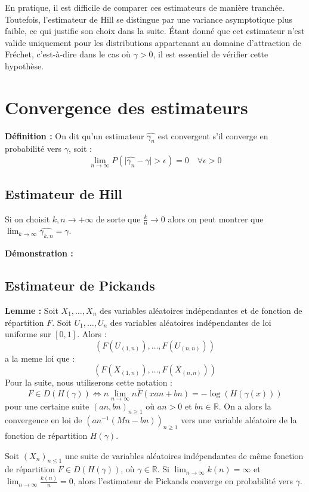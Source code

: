 \documentclass{article}
\begin{document}
En pratique, il est difficile de comparer ces estimateurs de manière tranchée. Toutefois, l'estimateur de Hill se distingue par une variance asymptotique plus faible, ce qui justifie son choix dans la suite. Étant donné que cet estimateur n'est valide uniquement pour les distributions appartenant au domaine d'attraction de Fréchet, c'est-à-dire dans le cas où \(\gamma > 0\), il est essentiel de vérifier cette hypothèse. 
\section{Convergence des estimateurs}

\textbf{Définition :}
On dit qu'un estimateur \(\hat{\gamma_{n}}\) est convergent s'il converge en probabilité vers \(\gamma\), soit :
\[
\lim_{n \to \infty} P(\lvert \hat{\gamma_{n}} - \gamma \rvert > \epsilon) = 0 \quad \forall \epsilon > 0
\]
\subsection{Estimateur de Hill}

Si on choisit \(k,n \to +\infty\) de sorte que \(\frac{k}{n} \to 0\) alors on peut montrer que \(\lim_{k \to \infty} \hat{\gamma_{k,n}} = \gamma\).

\textbf{Démonstration :}

\subsection{Estimateur de Pickands}
\textbf{Lemme :} Soit \(X_1, \dots, X_n\) des variables aléatoires indépendantes et de fonction de répartition \(F\). Soit \(U_1, \dots, U_n\) des variables aléatoires indépendantes de loi uniforme sur $[0,1]$. Alors :
\[
(F(U_{(1,n)}), \dots, F(U_{(n,n)}))
\]
a la meme loi que :
\[
(F(X_{(1,n)}), \dots, F(X_{(n,n)}))
\]
Pour la suite, nous utiliserons cette notation :
\[
F \in D(H(\gamma)) \Longleftrightarrow n \lim_{n \to \infty} n \bar{F}(xan + bn) = -\log(H(\gamma(x)))
\]
pour une certaine suite \((an,bn)_{n\geq 1}\) où \(an > 0\) et \(bn \in \mathbb{R}\).
On a alors la convergence en loi de \((an^{-1}(Mn-bn))_{n \geq 1}\) vers une variable aléatoire de la fonction de répartition \(H(\gamma)\).

Soit \((X_n)_{n \leq 1}\) une suite de variables aléatoires indépendantes de même fonction de répartition \(F \in D(H(\gamma))\), où \(\gamma \in \mathbb{R}\).
Si \(\lim_{n \to \infty} k(n) = \infty\) et \(\lim_{n \to \infty} \frac{k(n)}{n} = 0\), alors l'estimateur de Pickands converge en probabilité vers \(\gamma\).
\end{document}
